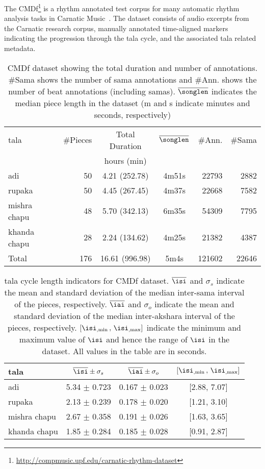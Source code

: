 The \acrfull{CMDf}\footnote{\url{http://compmusic.upf.edu/carnatic-rhythm-dataset}} is a rhythm annotated test corpus for many automatic rhythm analysis tasks in Carnatic Music~\cite{ajay:14:talaTrack}. The dataset consists of audio excerpts from the Carnatic research corpus, manually annotated time-aligned markers indicating the progression through the \gls{tala} cycle, and the associated \gls{tala} related metadata. 
\begin{table}[t]
\begin{center}
\tabcolsep=0.12cm
\begin{tabular}{@{}lrccrr@{}}
\toprule 
\Gls{tala} & \#Pieces & Total Duration & $\overline{\songlen}$ & \#Ann. & \#Sama\tabularnewline
 &  & hours (min) &  &  & \tabularnewline
\midrule 
\Gls{adi} & 50 & 4.21 (252.78) & 4m51s & 22793 & 2882\tabularnewline
\Gls{rupaka} & 50 & 4.45 (267.45) & 4m37s & 22668 & 7582\tabularnewline
\Gls{mishra chapu} & 48 & 5.70 (342.13) & 6m35s & 54309 & 7795\tabularnewline
\Gls{khanda chapu} & 28 & 2.24 (134.62) & 4m25s & 21382 & 4387\tabularnewline
\midrule 
Total & 176 & 16.61 (996.98) & 5m4s & 121602 & 22646\tabularnewline
\bottomrule 
\end{tabular}
\end{center}
\protect\caption[\acrshort{CMDf} dataset description]{\acrshort{CMDf} dataset showing the total duration and number of annotations. \#Sama shows the number of \gls{sama} annotations and \#Ann. shows the number of beat annotations (including \glspl{sama}). $\protect\overline{\protect\songlen}$ indicates the median piece length in the dataset (m and s indicate minutes and seconds, respectively)}
\label{tab:dataset:cmdf}
\end{table}
\begin{table}[t]
\centering
\begin{tabular}{@{}lccc@{}}
\toprule 
\Gls{tala} & $\overline{\isi} \pm \sigma_s$ & $\overline{\iai} \pm \sigma_o$ & $[{\isi}_{,\min} \, , \,  {\isi}_{,\max} ]$ \tabularnewline
\midrule 
\Gls{adi}  & 5.34 $\pm$ 0.723 & 0.167 $\pm$ 0.023 & $[$2.88, 7.07$]$\tabularnewline
\Gls{rupaka} & 2.13 $\pm$ 0.239 & 0.178 $\pm$ 0.020 & $[$1.21, 3.10$]$\tabularnewline
\Gls{mishra chapu} & 2.67 $\pm$ 0.358 & 0.191 $\pm$ 0.026 & $[$1.63, 3.65$]$\tabularnewline
\Gls{khanda chapu} & 1.85 $\pm$ 0.284 & 0.185 $\pm$ 0.028 & $[$0.91, 2.87$]$\tabularnewline
\bottomrule 
\end{tabular}
\protect\caption[\Gls{tala} cycle length indicators for \acrshort{CMDf} dataset]{\Gls{tala} cycle length indicators for \acrshort{CMDf} dataset. $\overline{\isi}$ and $\sigma_s$ indicate the mean and standard deviation of the median inter-\gls{sama} interval of the pieces, respectively. $\overline{\iai}$ and $\sigma_o$ indicate the mean and standard deviation of the median inter-\gls{akshara} interval of the pieces, respectively. $[{\isi}_{,\min} \, , \,  {\isi}_{,\max} ]$ indicate the minimum and maximum value of $\isi$ and hence the range of $\isi$ in the dataset. All values in the table are in seconds.}
\label{tab:datastat:cmdf}
\end{table}

